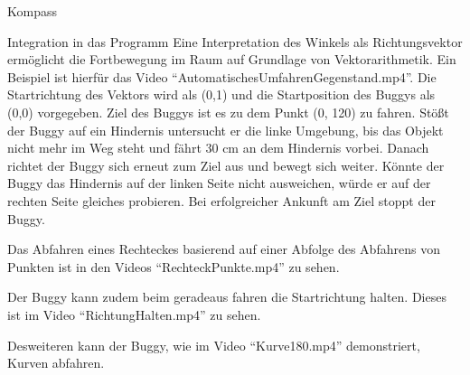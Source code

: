 \documentclass[12pt]{report}
\begin{document}
\begin{section}{Kompass}
\begin{subsection}{Integration in das Programm}
    Eine Interpretation des Winkels als Richtungsvektor ermöglicht die
    Fortbewegung im Raum auf Grundlage von Vektorarithmetik.
    Ein Beispiel ist hierfür das Video "`AutomatischesUmfahrenGegenstand.mp4"'.
    Die Startrichtung des Vektors wird als (0,1) und die Startposition des
    Buggys als (0,0) vorgegeben. Ziel des Buggys ist es zu dem Punkt (0, 120) zu fahren.
    Stößt der Buggy auf ein Hindernis untersucht er die linke Umgebung, bis das
    Objekt nicht mehr im Weg steht und fährt 30 cm an dem Hindernis vorbei.
    Danach richtet der Buggy sich erneut zum Ziel aus und bewegt sich weiter.
    Könnte der Buggy das Hindernis auf der linken Seite nicht ausweichen, würde
    er auf der rechten Seite gleiches probieren.
    Bei erfolgreicher Ankunft am Ziel stoppt der Buggy.

    Das Abfahren eines Rechteckes basierend auf einer Abfolge des Abfahrens von
    Punkten ist in den Videos "`RechteckPunkte.mp4"' zu sehen.

    Der Buggy kann zudem beim geradeaus fahren die Startrichtung halten. Dieses
    ist im Video "`RichtungHalten.mp4"' zu sehen.

    Desweiteren kann der Buggy, wie im Video "`Kurve180.mp4"' demonstriert,
    Kurven abfahren.
  \end{subsection}
\end{section}
\end{document}
